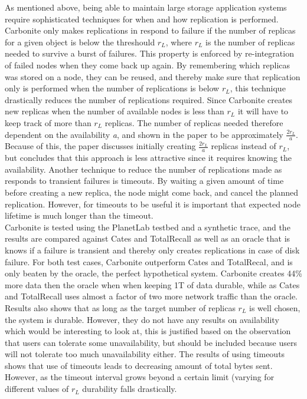 \documentclass{article}
\begin{document}
\noindent As mentioned above, being able to maintain large storage application systems require sophisticated techniques for when and how replication is performed. Carbonite only makes replications in respond to failure if the number of replicas for a given object is below the threshould $r_L$, where $r_L$ is the number of replicas needed to survive a burst of failures. This property is enforced by re-integration of failed nodes when they come back up again. By remembering which replicas was stored on a node, they can be reused, and thereby make sure that replication only is performed when the number of replications is below $r_L$, this technique drastically reduces the number of replications required. Since Carbonite creates new replicas when the number of available nodes is less than $r_L$ it will have to keep track of more than $r_L$ replicas. The number of replicas needed therefore dependent on the availability \textit{a}, and shown in the paper to be approximately $\frac{2r_L}{a}$. Because of this, the paper discusses initially creating $\frac{2r_L}{a}$ replicas instead of $r_L$, but concludes that this approach is less attractive since it requires knowing the availability.
Another technique to reduce the number of replications made as responds to transient failures is timeouts. By waiting a given amount of time before creating a new replica, the node might come back, and cancel the planned replication. However, for timeouts to be useful it is important that  expected node lifetime is much longer than the timeout.\\

\noindent Carbonite is tested using the PlanetLab testbed and a synthetic trace, and the results are compared against Cates and TotalRecall as well as an oracle that is knows if a failure is transient and thereby only creates replications in case of disk failure. For both test cases, Carbonite outperform Cates and TotalRecal, and is only beaten by the oracle, the perfect hypothetical system. Carbonite creates 44\% more data then the oracle when when keeping 1T of data durable, while as Cates and TotalRecall uses almost a factor of two more network traffic than the oracle. Results also shows that as long as the target number of replicas $r_L$ is well chosen, the system is durable. However, they do not have any results on availability which would be interesting to look at, this is justified based on the observation that users can tolerate some unavailability, but should be included because users will not tolerate too much unavailability either. 
The results of using timeouts shows that use of timeouts leads to decreasing amount of total bytes sent. However, as the timeout interval grows beyond a certain limit (varying for different values of $r_L$ durability falls drastically.\\
\end{document}
